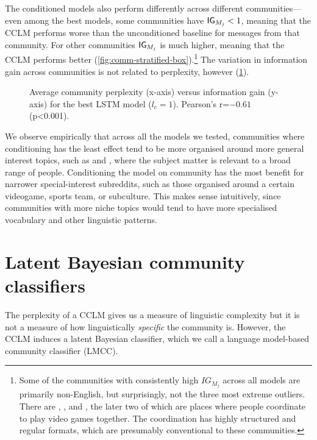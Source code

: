 \documentclass[11pt]{article}
\begin{document}
The conditioned models also perform differently across different communities---%
even among the best models, some communities have $\mathsf{IG}_{M_j} < 1$,
meaning that the CCLM performs worse than the unconditioned baseline for 
messages from that community.
For other communities $\mathsf{IG}_{M_j}$ is much higher, meaning that the CCLM performs better  
(\cref{fig:comm-stratified-box}).\footnote{
  Some of the communities with consistently high $IG_{M_j}$ 
  across all models are primarily non-English, 
  but surprisingly, not the three most extreme
  outliers. There are , , and , 
  the later two of which are places where people coordinate to play video games
  together. The coordination has highly structured and regular formats, which 
  are presumably conventional to these communities.}
%
The variation in information gain across communities is not 
related to perplexity, however (\cref{fig:ppl-info-gain}).

\begin{figure}
\caption{
  Average community perplexity (x-axis) versus information gain (y-axis)
  for the best LSTM model ($l_c = 1$). Pearson's r=$-0.61$ (p<0.001).
}
\label{fig:ppl-info-gain}
\end{figure}

We observe empirically that across all the models we
tested, communities where conditioning has the least effect tend to be
more organised around more general interest topics, such as 
 and , where the subject
matter is relevant to a broad range of people.  Conditioning the model
on community has the most benefit for narrower special-interest
subreddits, such as those organised around a certain videogame, sports
team, or subculture.  This makes sense intuitively, since communities
with more niche topics would tend to have more specialised vocabulary
and other linguistic patterns.

\section{Latent Bayesian community classifiers} \label{sec:lmcc}
The perplexity of a CCLM gives us a measure of linguistic complexity
but it is not a measure of how linguistically \emph{specific} the
community is. However, the CCLM induces a latent Bayesian classifier,
which we call a language model-based community classifier
(LMCC).
\end{document}
